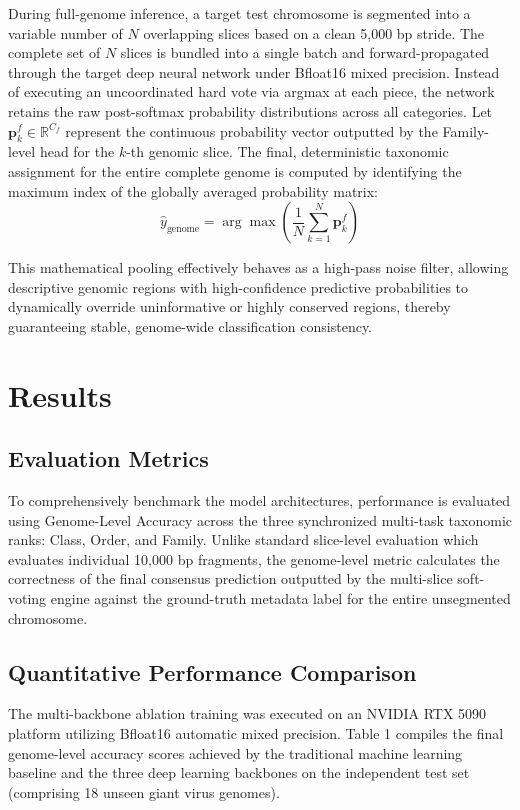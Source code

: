 \documentclass[11pt,a4paper]{article}
\begin{document}
During full-genome inference, a target test chromosome is segmented into a variable number of $N$ overlapping slices based on a clean 5,000 bp stride. The complete set of $N$ slices is bundled into a single batch and forward-propagated through the target deep neural network under Bfloat16 mixed precision. Instead of executing an uncoordinated hard vote via argmax at each piece, the network retains the raw post-softmax probability distributions across all categories. Let $\mathbf{p}_k^f \in \mathbb{R}^{C_f}$ represent the continuous probability vector outputted by the Family-level head for the $k$-th genomic slice. The final, deterministic taxonomic assignment for the entire complete genome is computed by identifying the maximum index of the globally averaged probability matrix:
\begin{equation}
\hat{y}_{\text{genome}} = \arg\max \left( \frac{1}{N} \sum_{k=1}^{N} \mathbf{p}_k^f \right)
\end{equation}

This mathematical pooling effectively behaves as a high-pass noise filter, allowing descriptive genomic regions with high-confidence predictive probabilities to dynamically override uninformative or highly conserved regions, thereby guaranteeing stable, genome-wide classification consistency.

\section{Results}

\subsection{Evaluation Metrics}
To comprehensively benchmark the model architectures, performance is evaluated using Genome-Level Accuracy across the three synchronized multi-task taxonomic ranks: Class, Order, and Family. Unlike standard slice-level evaluation which evaluates individual 10,000 bp fragments, the genome-level metric calculates the correctness of the final consensus prediction outputted by the multi-slice soft-voting engine against the ground-truth metadata label for the entire unsegmented chromosome.

\subsection{Quantitative Performance Comparison}
The multi-backbone ablation training was executed on an NVIDIA RTX 5090 platform utilizing Bfloat16 automatic mixed precision. Table 1 compiles the final genome-level accuracy scores achieved by the traditional machine learning baseline and the three deep learning backbones on the independent test set (comprising 18 unseen giant virus genomes).
\end{document}
